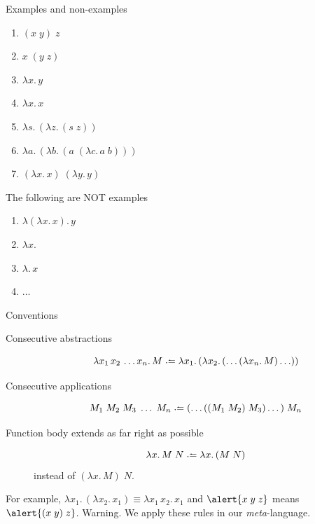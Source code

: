 \begin{frame}{Examples and non-examples}
  \begin{enumerate}
    \item $(x\;y)\;z$
    \item $x\;(y\; z)$
    \item $\lambda x.\, y$
    \item $\lambda x.\, x$
    \item $\lambda s.\,(\lambda z.\, (s \;z))$
    \item $\lambda a.\,(\lambda b.\, (a\;(\lambda c.\, a\; b)))$
    \item $(\lambda x.\, x)\;(\lambda y.\, y)$
  \end{enumerate}
  The following are NOT examples
  \begin{enumerate}
    \item $\lambda (\lambda x.\, x).\, y$
    \item $\lambda x. $
    \item $\lambda.\, x$
    \item $\dots$
  \end{enumerate}
\end{frame}

\begin{frame}{Conventions}
  \begin{description}
    \item[Consecutive abstractions]
      \[
        \lambda x_1\,x_2\,\ldots x_n.\, M \defeq \lambda x_1.\,(\lambda x_2.\,(\ldots (\lambda x_n.\, M)\ldots))
      \]
    \item[Consecutive applications]
      \[
        M_1\;M_2\; M_3\; \dots\;M_n \defeq (\dots((M_1\;M_2)\;M_3) \dots )\; M_n
      \]
    \item[Function body extends as far right as possible]
      \[
        \lambda x.\, M\;N \defeq \lambda x.\,(M\; N)
      \]
      instead of $(\lambda x.\,M)\; N$.
  \end{description}
  For example, 
      $\lambda x_1.\,(\lambda x_2.\, x_1) \equiv \lambda x_1\,x_2.\,x_1$
      and
      $\alert{x\;y\;z}$ means $\alert{(x\; y)\;z}$. 
  \alert{Warning}. We apply these rules in our \emph{meta}-language.
\end{frame}

